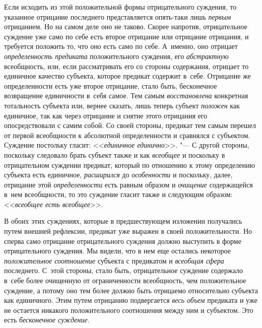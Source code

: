 Если исходить из этой положительной формы отрицательного суждения, то указанное
отрицание последнего представляется опять-таки лишь {\em первым} отрицанием.
Но на самом деле оно не таково. Скорее напротив, отрицательное суждение уже
само по себе есть второе отрицание или отрицание отрицания, и требуется
положить то, что оно есть само по себе. А~именно, оно отрицает
{\em определенность предиката} положительного суждения, его {\em абстрактную}
всеобщность, или, если рассматривать его со стороны содержания, отрицает то
единичное качество субъекта, которое предикат содержит в~себе. Отрицание же
определенности есть уже второе отрицание, стало быть, бесконечное возвращение
единичности в~себя самое. Тем самым {\em восстановлена} конкретная тотальность
субъекта или, вернее сказать, лишь теперь субъект {\em положен} как единичное,
так как через отрицание и снятие этого отрицания его опосредствовали с самим
собой. Со своей стороны, предикат тем самым перешел от первой всеобщности к
абсолютной определенности и сравнялся с субъектом. Суждение постольку гласит:
<<{\em единичное единично}>>. "--- С другой стороны, поскольку следовало брать
субъект также и как {\em всеобщее} и поскольку в отрицательном суждении
предикат, который по отношению к этому определению субъекта есть единичное,
{\em расширился} до {\em особенности} и поскольку, далее, отрицание этой
{\em определенности} есть равным образом и {\em очищение} содержащейся в~нем
всеобщности, то это суждение гласит также и следующим образом:
<<{\em всеобщее есть всеобщее}>>.

В обоих этих суждениях, которые в предшествующем
изложении
получались путем внешней рефлексии, предикат уже выражен в
своей положительности. Но сперва само отрицание отрицательного суждения
должно выступить в форме отрицательного суждения. Мы видели, что в нем еще
остались некоторое {\em положительное соотношение} субъекта с предикатом и
{\em всеобщая сфера} последнего. С~этой стороны, стало быть,
отрицательное суждение содержало в~себе более очищенную от ограниченности
всеобщность, чем положительное суждение, а потому оно тем более должно быть
отрицаемо относительно субъекта как единичного. Этим путем отрицанию
подвергается {\em весь объем} предиката и уже не остается никакого
положительного соотношения между ним и субъектом. Это есть
{\em бесконечное суждение}.

